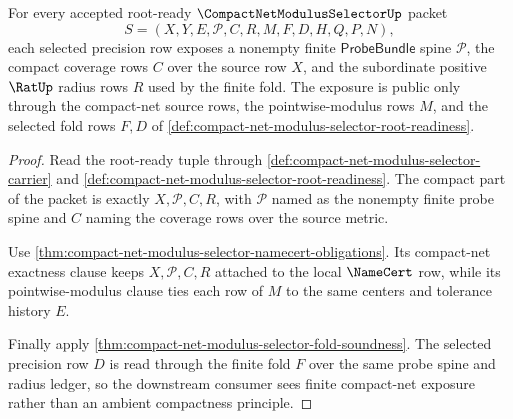 \begin{theorem}
\label{thm:compact-net-modulus-selector-finite-net-exposure}
For every accepted root-ready $\CompactNetModulusSelectorUp$ packet
$$
S=(X,Y,E,\mathcal{P},C,R,M,F,D,H,Q,P,N),
$$
each selected precision row exposes a nonempty finite $\mathsf{ProbeBundle}$ spine $\mathcal{P}$, the compact coverage rows $C$ over the source row $X$, and the subordinate positive $\RatUp$ radius rows $R$ used by the finite fold. The exposure is public only through the compact-net source rows, the pointwise-modulus rows $M$, and the selected fold rows $F,D$ of \autoref{def:compact-net-modulus-selector-root-readiness}.
\end{theorem}
\begin{proof}
Read the root-ready tuple through \autoref{def:compact-net-modulus-selector-carrier} and \autoref{def:compact-net-modulus-selector-root-readiness}. The compact part of the packet is exactly $X,\mathcal{P},C,R$, with $\mathcal{P}$ named as the nonempty finite probe spine and $C$ naming the coverage rows over the source metric.

Use \autoref{thm:compact-net-modulus-selector-namecert-obligations}. Its compact-net exactness clause keeps $X,\mathcal{P},C,R$ attached to the local $\NameCert$ row, while its pointwise-modulus clause ties each row of $M$ to the same centers and tolerance history $E$.

Finally apply \autoref{thm:compact-net-modulus-selector-fold-soundness}. The selected precision row $D$ is read through the finite fold $F$ over the same probe spine and radius ledger, so the downstream consumer sees finite compact-net exposure rather than an ambient compactness principle.
\end{proof}

